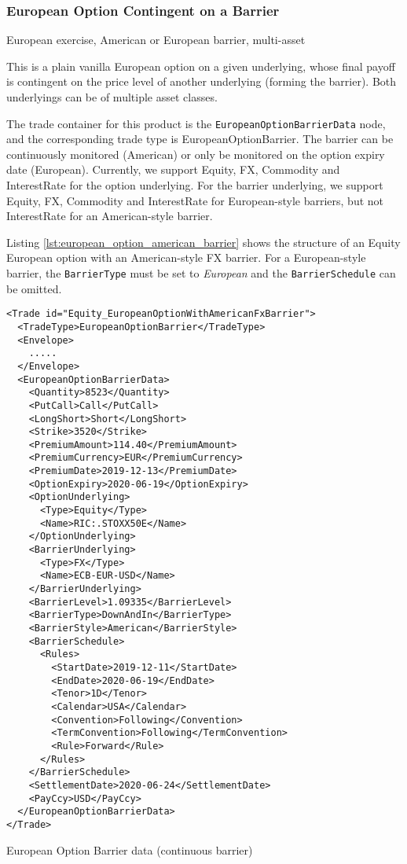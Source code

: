 \subsubsection{European Option Contingent on a Barrier}

European exercise, American or European barrier, multi-asset

This is a plain vanilla European option on a given underlying, whose final payoff is contingent on the
price level of another underlying (forming the barrier). Both underlyings can be of multiple asset classes.

The trade container for this product is the \verb+EuropeanOptionBarrierData+ node, and the corresponding
trade type is EuropeanOptionBarrier. The barrier can be continuously monitored (American) or only be
monitored on the option expiry date (European). Currently, we support Equity, FX, Commodity and InterestRate
for the option underlying. For the barrier underlying, we support Equity, FX, Commodity and InterestRate
for European-style barriers, but not InterestRate for an American-style barrier.

Listing \ref{lst:european_option_american_barrier} shows the structure of an Equity European option with
an American-style FX barrier. For a European-style barrier, the \lstinline!BarrierType! must be set
to \emph{European} and the \lstinline!BarrierSchedule! can be omitted.

\begin{listing}[H]
\begin{verbatim} 
<Trade id="Equity_EuropeanOptionWithAmericanFxBarrier">
  <TradeType>EuropeanOptionBarrier</TradeType>
  <Envelope>
    .....
  </Envelope>
  <EuropeanOptionBarrierData>
    <Quantity>8523</Quantity>
    <PutCall>Call</PutCall>
    <LongShort>Short</LongShort>
    <Strike>3520</Strike>
    <PremiumAmount>114.40</PremiumAmount>
    <PremiumCurrency>EUR</PremiumCurrency>
    <PremiumDate>2019-12-13</PremiumDate>
    <OptionExpiry>2020-06-19</OptionExpiry>
    <OptionUnderlying>
      <Type>Equity</Type>
      <Name>RIC:.STOXX50E</Name>
    </OptionUnderlying>
    <BarrierUnderlying>
      <Type>FX</Type>
      <Name>ECB-EUR-USD</Name>
    </BarrierUnderlying>
    <BarrierLevel>1.09335</BarrierLevel>
    <BarrierType>DownAndIn</BarrierType>
    <BarrierStyle>American</BarrierStyle>
    <BarrierSchedule>
      <Rules>
        <StartDate>2019-12-11</StartDate>
        <EndDate>2020-06-19</EndDate>
        <Tenor>1D</Tenor>
        <Calendar>USA</Calendar>
        <Convention>Following</Convention>
        <TermConvention>Following</TermConvention>
        <Rule>Forward</Rule>
      </Rules>
    </BarrierSchedule>
    <SettlementDate>2020-06-24</SettlementDate>
    <PayCcy>USD</PayCcy>
  </EuropeanOptionBarrierData>
</Trade>
\end{verbatim}
\caption{European Option Barrier data (continuous barrier)}
\label{lst:european_option_american_barrier}
\end{listing}

